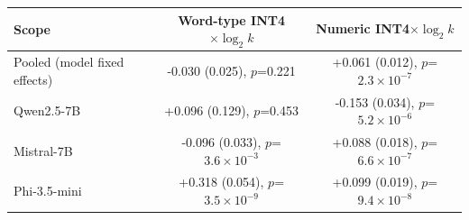 \begin{tabular}{lcc}
\toprule
Scope & Word-type INT4$\times\log_2 k$ & Numeric INT4$\times\log_2 k$ \\
\midrule
Pooled (model fixed effects) & -0.030 (0.025), $p$=0.221 & +0.061 (0.012), $p$=$2.3\times10^{-7}$ \\
Qwen2.5-7B & +0.096 (0.129), $p$=0.453 & -0.153 (0.034), $p$=$5.2\times10^{-6}$ \\
Mistral-7B & -0.096 (0.033), $p$=$3.6\times10^{-3}$ & +0.088 (0.018), $p$=$6.6\times10^{-7}$ \\
Phi-3.5-mini & +0.318 (0.054), $p$=$3.5\times10^{-9}$ & +0.099 (0.019), $p$=$9.4\times10^{-8}$ \\
\bottomrule
\end{tabular}
